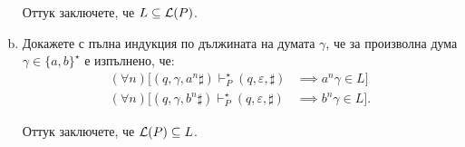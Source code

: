 \begin{extra}
\begin{example}
\begin{enumerate}[a)]
    Оттук заключете, че $L \subseteq \mathcal{L}(P)$.
  \item
    Докажете с пълна индукция по дължината на думата $\gamma$, че за произволна дума $\gamma \in \{a, b\}^\star$ е изпълнено, че:
    \begin{align}
      (\forall n)[(q, \gamma, a^n\sharp) \vdash^\star_P (q, \varepsilon, \sharp) & \implies a^n\gamma \in L] \label{eq:omega-ab:3}\\
      (\forall n)[(q, \gamma, b^n\sharp) \vdash^\star_P (q, \varepsilon, \sharp) & \implies b^n\gamma \in L]. \label{eq:omega-ab:4}
    \end{align}

    
    
    Оттук заключете, че $\mathcal{L}(P) \subseteq L$.
  \end{enumerate}
\end{example}


\end{extra}
